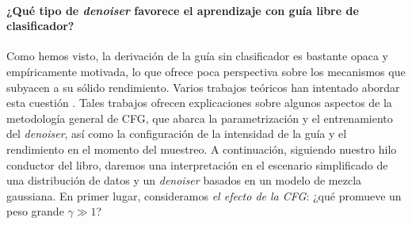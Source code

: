 \documentclass[../../book-main_es.tex]{subfiles}
\begin{document}
\paragraph{¿Qué tipo de \textit{denoiser} favorece el aprendizaje con guía libre de clasificador?}
Como hemos visto, la derivación de la guía sin clasificador es bastante opaca y
empíricamente motivada,
lo que ofrece poca perspectiva sobre los mecanismos que subyacen a su sólido rendimiento.
Varios trabajos teóricos han intentado abordar esta cuestión
\cite{Bradley2024-jg,Li2025-li,Wu2024-js}.
Tales trabajos ofrecen explicaciones sobre algunos aspectos de la metodología general de CFG,
que abarca la parametrización y el entrenamiento del \textit{denoiser},
así como la configuración de la intensidad de la guía
y el rendimiento en el momento del muestreo.
A continuación, siguiendo nuestro hilo conductor del libro, daremos una interpretación
en el escenario simplificado de una distribución de datos y un \textit{denoiser} basados en un modelo de mezcla gaussiana.
En primer lugar, consideramos \textit{el efecto de la CFG}: ¿qué promueve un peso grande $\gamma \gg 1$?
\end{document}
